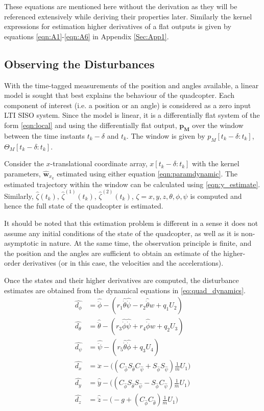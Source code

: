 \documentclass[letterpaper%
, twoside%
, 12pt%
,memoire%
, english%
,creativecommons,hyperref%
]{thETS}
\theoremstyle{newThmStyle}
\begin{document}
These equations are mentioned here without the derivation as they will be referenced extensively while deriving their properties later. Similarly the kernel  expressions for estimation higher derivatives of a flat outputs is given by equations \eqref{eqn:A1}-\eqref{eqn:A6} in Appendix \ref{Sec:App1}.


\subsection{Observing the Disturbances} \label{Sec:estimationtoobserver}
With the time-tagged measurements of the position and angles available, a linear model is sought that best explains the behaviour of the quadcopter. Each component of interest (i.e. a position or an angle) is considered as a zero input LTI SISO system. Since the model is linear, it is a differentially flat system of the form \eqref{eqn:local} and using the differentially flat output, $\mathbf{p_M}$ over the window between the time instants $t_k-\delta$ and $t_k$. The window is given by $p_M[t_k-\delta:t_k]$, $\Theta_M[t_k-\delta:t_k]$. 

Consider the $x$-translational coordinate array, $x[t_k-\delta:t_k]$ with the kernel parameters, $\hat{\mathbf{w}}_{x_k}$ estimated using either equation \eqref{eqn:paramdynamic}. The estimated trajectory within the window can be calculated using \eqref{eqn:y_estimate}. Similarly, $\hat{\zeta}(t_k)$, $\hat{\zeta}^{(1)}(t_k)$, $\hat{\zeta}^{(2)}(t_k)$, $\zeta=x,y,z,\theta,\phi,\psi$ is computed and hence the full state of the quadcopter is estimated.

It should be noted that this estimation problem is different in a sense it does not assume any initial conditions of the state of the quadcopter, as well as it is non-asymptotic in nature. At the same time, the observation principle is finite, and the position and the angles are sufficient to obtain an estimate of the higher-order derivatives (or in this case, the velocities and the accelerations).

Once the states and their higher derivatives are computed, the disturbance estimates are obtained from the dynamical equations in \eqref{eq:quad_dynamics}. 
\begin{equation}
	\label{eq:KDO}
    \begin{aligned}
    \hat{d_\phi}&=\hat{\ddot{\phi}}-(r_1\hat{\dot{\theta}}\hat{\dot{\psi}}-r_2\hat{\dot{\theta}}w+q_1U_2)\\
    \hat{d_\theta}&=\hat{\ddot{\theta}}-(r_3\hat{\dot{\phi}}\hat{\dot{\psi}}+r_4\hat{\dot{\phi}}w+q_2U_3)\\
    \hat{d_\psi}&=\hat{\ddot{\psi}}-(r_5\hat{\dot{\theta}}\hat{\dot{\phi}}+q_3U_4)\\
    \hat{d_x}&=\hat{\ddot{x}}-\Big((C_{\hat{\phi}}S_{\hat{\theta}}C_{\hat{\psi}}+S_{\hat{\phi}}S_{\hat{\psi}})\frac{1}{m}U_1\Big)\\
    \hat{d_y}&=\hat{\ddot{y}}-\Big((C_{\hat{\phi}}S_{\hat{\theta}}S_{\hat{\psi}}-S_{\hat{\phi}}C_{\hat{\psi}})\frac{1}{m}U_1\Big)\\
    \hat{d_z}&=\hat{\ddot{z}}-\Big(-g+(C_{\hat{\phi}}C_{\hat{\theta}})\frac{1}{m}U_1\Big)
    \end{aligned}
\end{equation}
\end{document}
